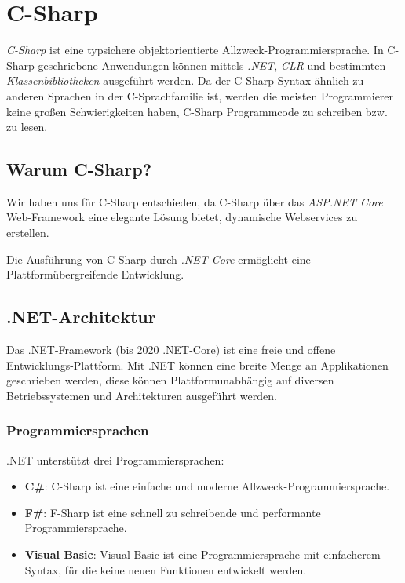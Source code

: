\pagebreak
\section{C-Sharp}
\label{C-Sharp}

\textit{C-Sharp} ist eine typsichere objektorientierte Allzweck-Programmiersprache.
In C-Sharp geschriebene Anwendungen können mittels \textit{.NET}, \textit{CLR} und bestimmten 
\textit{Klassenbibliotheken} ausgeführt werden. 
Da der C-Sharp Syntax ähnlich zu anderen Sprachen in der C-Sprachfamilie ist, werden die meisten
Programmierer keine großen Schwierigkeiten haben, C-Sharp Programmcode zu schreiben bzw. zu lesen.  
\cite{csharpmicrosoft}

\subsection{Warum C-Sharp?}
Wir haben uns für C-Sharp entschieden, da C-Sharp über das \textit{ASP.NET Core} Web-Framework eine elegante 
Lösung bietet, dynamische Webservices zu erstellen.

Die Ausführung von C-Sharp durch \textit{.NET-Core} ermöglicht eine Plattformübergreifende Entwicklung.

\subsection{.NET-Architektur}
Das .NET-Framework (bis 2020 .NET-Core) ist eine freie und offene Entwicklungs-Plattform. Mit .NET können eine breite Menge an
Applikationen geschrieben werden, diese können Plattformunabhängig auf diversen Betriebssystemen
und Architekturen ausgeführt werden. \cite{dotnetmicrosoft} 

\subsubsection{Programmiersprachen}
.NET unterstützt drei Programmiersprachen:
\begin{itemize}
    \item \textbf{C\#}: C-Sharp ist eine einfache und moderne Allzweck-Programmiersprache.
    \item \textbf{F\#}: F-Sharp ist eine schnell zu schreibende und performante Programmiersprache.
    \item \textbf{Visual Basic}: Visual Basic ist eine Programmiersprache mit einfacherem Syntax, für die keine
    neuen Funktionen entwickelt werden.  
\end{itemize}

